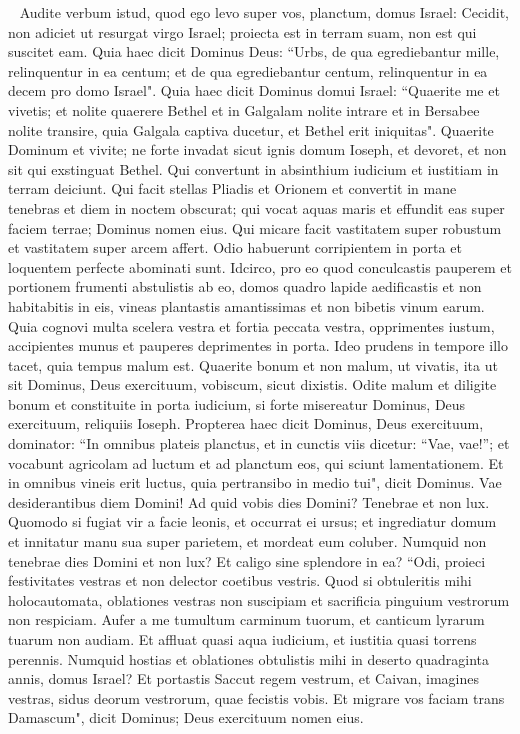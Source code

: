 \begin{biblechapter}   
\verse Audite verbum istud, quod ego levo super vos, planctum, domus Israel: 
\verse Cecidit, non adiciet ut resurgat virgo Israel; proiecta est in terram suam, non est qui suscitet eam. 
\verse Quia haec dicit Dominus Deus: “Urbs, de qua egrediebantur mille, relinquentur in ea centum; et de qua egrediebantur centum, relinquentur in ea decem pro domo Israel". 
\verse Quia haec dicit Dominus domui Israel: “Quaerite me et vivetis; 
\verse et nolite quaerere Bethel et in Galgalam nolite intrare et in Bersabee nolite transire, quia Galgala captiva ducetur, et Bethel erit iniquitas". 
\verse Quaerite Dominum et vivite; ne forte invadat sicut ignis domum Ioseph, et devoret, et non sit qui exstinguat Bethel. 
\verse Qui convertunt in absinthium iudicium et iustitiam in terram deiciunt. 
\verse Qui facit stellas Pliadis et Orionem et convertit in mane tenebras et diem in noctem obscurat; qui vocat aquas maris et effundit eas super faciem terrae; Dominus nomen eius. 
\verse Qui micare facit vastitatem super robustum et vastitatem super arcem affert. 
\verse Odio habuerunt corripientem in porta et loquentem perfecte abominati sunt. 
\verse Idcirco, pro eo quod conculcastis pauperem et portionem frumenti abstulistis ab eo, domos quadro lapide aedificastis et non habitabitis in eis, vineas plantastis amantissimas et non bibetis vinum earum. 
\verse Quia cognovi multa scelera vestra et fortia peccata vestra, opprimentes iustum, accipientes munus et pauperes deprimentes in porta. 
\verse Ideo prudens in tempore illo tacet, quia tempus malum est. 
\verse Quaerite bonum et non malum, ut vivatis, ita ut sit Dominus, Deus exercituum, vobiscum, sicut dixistis. 
\verse Odite malum et diligite bonum et constituite in porta iudicium, si forte misereatur Dominus, Deus exercituum, reliquiis Ioseph. 
\verse Propterea haec dicit Dominus, Deus exercituum, dominator: “In omnibus plateis planctus, et in cunctis viis dicetur: “Vae, vae!”; et vocabunt agricolam ad luctum et ad planctum eos, qui sciunt lamentationem. 
\verse Et in omnibus vineis erit luctus, quia pertransibo in medio tui", dicit Dominus. 
\verse Vae desiderantibus diem Domini! Ad quid vobis dies Domini? Tenebrae et non lux. 
\verse Quomodo si fugiat vir a facie leonis, et occurrat ei ursus; et ingrediatur domum et innitatur manu sua super parietem, et mordeat eum coluber. 
\verse Numquid non tenebrae dies Domini et non lux? Et caligo sine splendore in ea? 
\verse “Odi, proieci festivitates vestras et non delector coetibus vestris. 
\verse Quod si obtuleritis mihi holocautomata, oblationes vestras non suscipiam et sacrificia pinguium vestrorum non respiciam. 
\verse Aufer a me tumultum carminum tuorum, et canticum lyrarum tuarum non audiam. 
\verse Et affluat quasi aqua iudicium, et iustitia quasi torrens perennis. 
\verse Numquid hostias et oblationes obtulistis mihi in deserto quadraginta annis, domus Israel? 
\verse Et portastis Saccut regem vestrum, et Caivan, imagines vestras, sidus deorum vestrorum, quae fecistis vobis. 
\verse Et migrare vos faciam trans Damascum", dicit Dominus; Deus exercituum nomen eius. 
\end{biblechapter}

